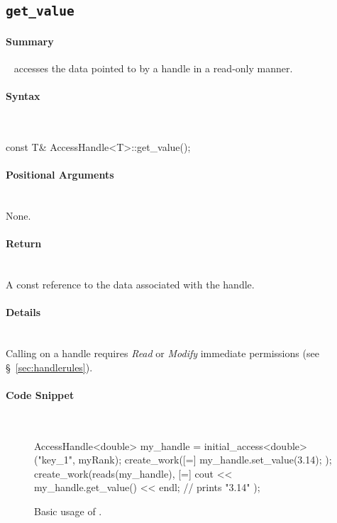 \subsection{\texttt{get\_value}}
\label{ssec:api_fe_get_value}

\paragraph{Summary} \mbox{}\
 accesses the data pointed to by a \gls{handle} in a read-only manner.

\paragraph{Syntax}\mbox{}\\
\begin{CppCode}
const T& AccessHandle<T>::get_value();
\end{CppCode}

\paragraph{Positional Arguments}\mbox{}\\ 
None.

\paragraph{Return}\mbox{}\\ 
A const reference to the data associated with the \gls{handle}.  

\paragraph{Details}\mbox{}\\ 
Calling  on a \gls{handle} requires {\it Read} or {\it
Modify} \gls{immediate permissions} (see \S~\ref{sec:handlerules}).


\paragraph{Code Snippet}\mbox{}\\ 
\begin{figure}[!h]
\begin{CppCodeNumb}
AccessHandle<double> my_handle = initial_access<double>("key_1", myRank);
create_work([=]{
  my_handle.set_value(3.14);
});
create_work(reads(my_handle), [=]{
  cout << my_handle.get_value() << endl; // prints "3.14"
});
\end{CppCodeNumb}
\label{fig:fe_api_get_value}
\caption{Basic usage of \protect{}.}
\end{figure}


